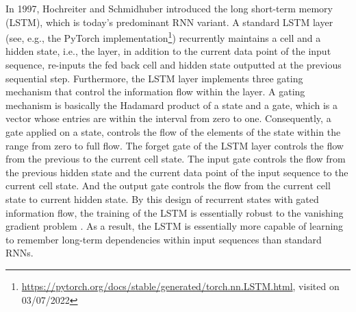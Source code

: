 In 1997, Hochreiter and Schmidhuber \cite{Hochreiter1997} introduced
the long short-term memory (LSTM),
which is today's predominant \cite{schmidhuber_2021} RNN variant.
A standard LSTM layer
(see, e.g., the PyTorch implementation\footnote{
    \url{https://pytorch.org/docs/stable/generated/torch.nn.LSTM.html}, visited on 03/07/2022
})
recurrently maintains a cell and a hidden state,
i.e., the layer,
in addition to the current data point of the input sequence,
re-inputs the fed back cell and hidden state
outputted at the previous sequential step.
Furthermore, the LSTM layer implements three gating mechanism
that control the information flow within the layer.
A gating mechanism is basically
the Hadamard product of a state and a gate, which is a vector whose entries 
are within the interval from zero to one. 
Consequently, a gate applied on a state, controls the 
flow of the elements of the state within the range from zero to full flow.
The forget gate of the LSTM layer controls
the flow from the previous to the current cell state.
The input gate controls the flow from the
previous hidden state and the current data point of the input sequence
to the current cell state.
And the output gate controls
the flow from the current cell state to current hidden state.
By this design of recurrent states with gated information flow,
the training of the LSTM is essentially 
robust to the vanishing gradient problem \cite{pascanu2013difficulty}.
As a result, the LSTM is essentially 
more capable of learning to remember long-term dependencies within input sequences
than standard RNNs.





